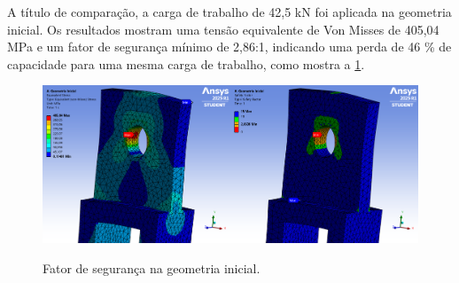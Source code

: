 A título de comparação, a carga de trabalho de 42,5 kN foi aplicada na geometria inicial. Os resultados mostram uma tensão equivalente de Von Misses de 405,04 MPa e um fator de segurança mínimo de 2,86:1, indicando uma perda de 46 \% de capacidade para uma mesma carga de trabalho, como mostra a  \ref{fatorsegurancainicial}.

\begin{figure}[!htb]
   \centering
     \caption{Fator de segurança na geometria inicial.}
    \includegraphics[width=1.0\linewidth, trim=0 0 0 0, clip]{Figuras/geometria inicial tensao equivalente 5.png}\\
    \hspace{1.5cm}\raggedright \fontsize{10}{12}\selectfont{Fonte: Elaborado pelo autor, 2025.}
    \label{fatorsegurancainicial}
\end{figure}


